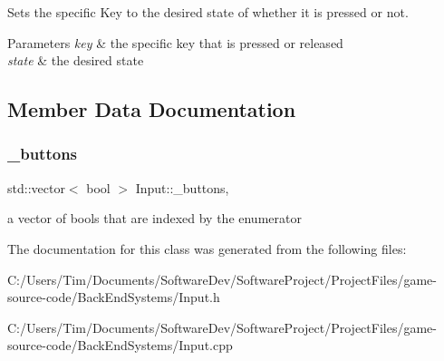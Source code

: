 Sets the specific Key to the desired state of whether it is pressed or not. 


\begin{DoxyParams}{Parameters}
{\em key} & the specific key that is pressed or released \\
\hline
{\em state} & the desired state \\
\hline
\end{DoxyParams}


\subsection{Member Data Documentation}
\mbox{\label{class_input_affef708e1d603d97a7218b64eab063b5}} 
\subsubsection{\texorpdfstring{\+\_\+buttons}{\_buttons}}
{\footnotesize\ttfamily std\+::vector$<$ bool $>$ Input\+::\+\_\+buttons\hspace{0.3cm}{\ttfamily [static]}, {\ttfamily [private]}}

a vector of bools that are indexed by the enumerator 

The documentation for this class was generated from the following files\+:\begin{DoxyCompactItemize}
\item 
C\+:/\+Users/\+Tim/\+Documents/\+Software\+Dev/\+Software\+Project/\+Project\+Files/game-\/source-\/code/\+Back\+End\+Systems/Input.\+h\item 
C\+:/\+Users/\+Tim/\+Documents/\+Software\+Dev/\+Software\+Project/\+Project\+Files/game-\/source-\/code/\+Back\+End\+Systems/Input.\+cpp\end{DoxyCompactItemize}
